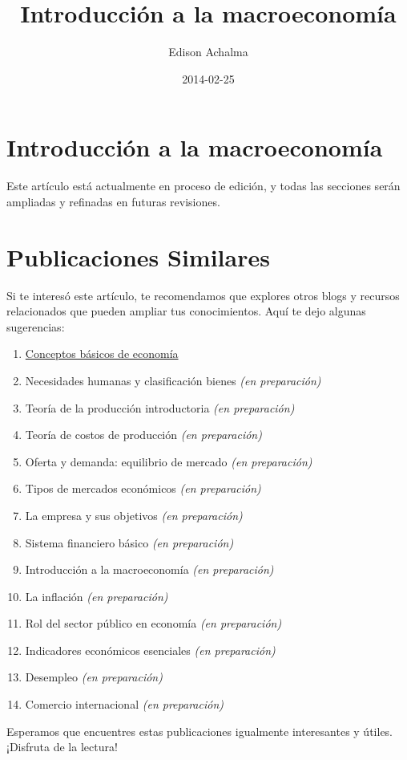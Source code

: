 \documentclass[
  jou,
  floatsintext,
  longtable,
  a4paper,
  nolmodern,
  notxfonts,
  notimes,
  12pt,
  colorlinks=true,linkcolor=blue,citecolor=blue,urlcolor=blue]{apa7}
\title{Introducción a la macroeconomía}
\author{Edison Achalma}
\affiliation{
{Escuela Profesional de Economía, Universidad Nacional de San Cristóbal
de Huamanga}}
\date{2014-02-25}
\providecommand{\tightlist}{%
  \setlength{\itemsep}{0pt}\setlength{\parskip}{0pt}}
\begin{document}
\maketitle


\hypertarget{toc}{}
\tableofcontents
\newpage
\section[Introduction]{Introducción a la macroeconomía}

\setcounter{secnumdepth}{3}

\setlength\LTleft{0pt}




Este artículo está actualmente en proceso de edición, y todas las
secciones serán ampliadas y refinadas en futuras revisiones.

\section{Publicaciones Similares}\label{publicaciones-similares}

Si te interesó este artículo, te recomendamos que explores otros blogs y
recursos relacionados que pueden ampliar tus conocimientos. Aquí te dejo
algunas sugerencias:

\begin{enumerate}
\def\labelenumi{\arabic{enumi}.}
\tightlist
\item
  \href{https://achalmaedison.netlify.app/cursos/pre_economia/2014-i/sesiones/01-conceptos-basicos-de-economia/index.pdf}{}
  \href{https://achalmaedison.netlify.app/cursos/pre_economia/2014-i/sesiones/01-conceptos-basicos-de-economia}{Conceptos
  básicos de economía}
\item
  Necesidades humanas y clasificación bienes \emph{(en preparación)}
\item
  Teoría de la producción introductoria \emph{(en preparación)}
\item
  Teoría de costos de producción \emph{(en preparación)}
\item
  Oferta y demanda: equilibrio de mercado \emph{(en preparación)}
\item
  Tipos de mercados económicos \emph{(en preparación)}
\item
  La empresa y sus objetivos \emph{(en preparación)}
\item
  Sistema financiero básico \emph{(en preparación)}
\item
  Introducción a la macroeconomía \emph{(en preparación)}
\item
  La inflación \emph{(en preparación)}
\item
  Rol del sector público en economía \emph{(en preparación)}
\item
  Indicadores económicos esenciales \emph{(en preparación)}
\item
  Desempleo \emph{(en preparación)}
\item
  Comercio internacional \emph{(en preparación)}
\end{enumerate}

Esperamos que encuentres estas publicaciones igualmente interesantes y
útiles. ¡Disfruta de la lectura!
\end{document}
